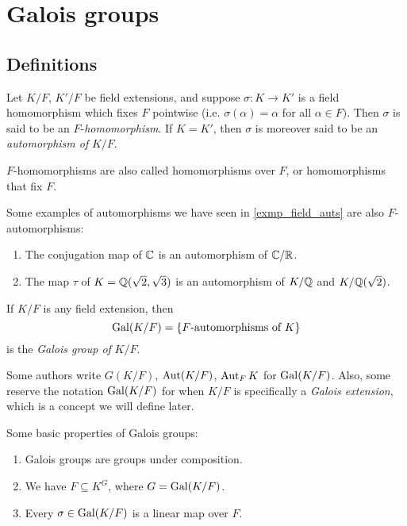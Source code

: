 \chapter{Galois groups}

\section{Definitions}

\begin{definition}
    Let $K/F$, $K'/F$ be field extensions, and suppose $\sigma: K \to K'$ is a field homomorphism which fixes $F$ pointwise (i.e. $\sigma(\alpha) = \alpha$ for all $\alpha \in F)$. Then $\sigma$ is said to be an $F$-\emph{homomorphism}. If $K = K'$, then $\sigma$ is moreover said to be an \emph{automorphism of} $K/F$.
\end{definition}

\begin{remark}
    $F$-homomorphisms are also called homomorphisms over $F$, or homomorphisms that fix $F$.
\end{remark}

\begin{example}
    Some examples of automorphisms we have seen in \cref{exmp_field_auts} are also $F$-automorphisms:
    \begin{enumerate}
        \item The conjugation map of $\mathbb{{C}}$ is an automorphism of $\mathbb{{C}}/\mathbb{{R}}$.
        \item The map $\tau$ of $K = \mathbb{{Q}}(\sqrt{2}, \sqrt{3})$ is an automorphism of $K/\mathbb{{Q}}$ and $K/\mathbb{{Q}}(\sqrt{2})$.
    \end{enumerate}
\end{example}

\begin{definition}
    If $K/F$ is any field extension, then
    \[
        \operatorname{Gal}(K/F) = \{F\text{-automorphisms of } K\}
    \]
    is the \emph{Galois group of} $K/F$.
\end{definition}

\begin{remark}
    Some authors write $G(K/F)$, $\operatorname{Aut}(K/F)$, $\operatorname{Aut}_F{K}$ for $\operatorname{Gal}(K/F)$. Also, some reserve the notation $\operatorname{Gal}(K/F)$ for when $K/F$ is specifically a \emph{Galois extension}, which is a concept we will define later.
\end{remark}

\begin{proposition}
    Some basic properties of Galois groups:
    \begin{enumerate}[label=(\alph*)]
        \item Galois groups are groups under composition.
        \item We have $F \subseteq K^G$, where $G = \operatorname{Gal}(K/F)$.
        \item Every $\sigma \in \operatorname{Gal}(K/F)$ is a linear map over $F$.
    \end{enumerate}
\end{proposition}

